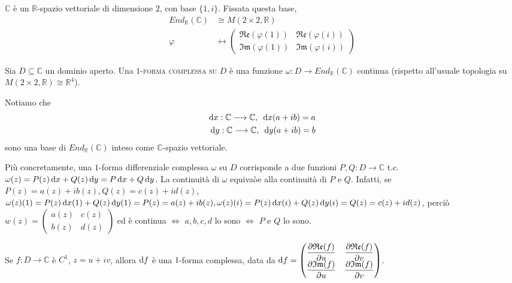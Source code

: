 $\mathbb{C}$ è un $\mathbb{R}$-spazio vettoriale di dimensione $2$, con base $\{1, i\}$. Fissata questa base,
\begin{align*}
  End_{\mathbb{R}}(\mathbb{C}) &\cong M(2 \times 2, \mathbb{R})\\
  \varphi &\longleftrightarrow \begin{pmatrix}
    \mathfrak{Re}(\varphi(1)) & \mathfrak{Re}(\varphi(i))\\
    \mathfrak{Im}(\varphi(1)) & \mathfrak{Im}(\varphi(i))
\end{pmatrix}
\end{align*}

\begin{defn}
  Sia $D \subseteq \mathbb{C}$ un dominio aperto. Una \textsc{$1$-forma complessa su $D$} è una funzione $\omega:D \longrightarrow End_{\mathbb{R}}(\mathbb{C})$ continua (rispetto all'usuale topologia su $M(2 \times 2, \mathbb{R}) \cong \mathbb{R}^4$).
\end{defn}

Notiamo che
\begin{align*}
  \mathop{}\!\mathrm{d} x: \mathbb{C} \longrightarrow \mathbb{C}, \,\,\, \mathop{}\!\mathrm{d} x(a+ib)=a\\
  \mathop{}\!\mathrm{d} y: \mathbb{C} \longrightarrow \mathbb{C}, \,\,\, \mathop{}\!\mathrm{d} y(a+ib)=b
\end{align*}
sono una base di $End_{\mathbb{R}}(\mathbb{C})$ inteso come $\mathbb{C}$-spazio vettoriale.

Più concretamente, una $1$-forma differenziale complessa $\omega$ su $D$ corrisponde a due funzioni $P, Q:D \longrightarrow \mathbb{C}$ t.c. $\omega(z)=P(z)\mathop{}\!\mathrm{d} x+Q(z)\mathop{}\!\mathrm{d} y=P\mathop{}\!\mathrm{d} x+Q\mathop{}\!\mathrm{d} y$. La continuità di $\omega$ equivaòe alla continuità di $P$ e $Q$. Infatti, se $P(z)=a(z)+ib(z), Q(z)=c(z)+id(z)$, $\omega(z)(1)=P(z)\mathop{}\!\mathrm{d} x(1)+Q(z)\mathop{}\!\mathrm{d} y(1)=P(z)=a(z)+ib(z), \omega(z)(i)=P(z)\mathop{}\!\mathrm{d} x(i)+Q(z)\mathop{}\!\mathrm{d} y(i)=Q(z)=c(z)+id(z)$, perciò $w(z)=\begin{pmatrix}
  a(z) & c(z)\\
  b(z) & d(z)
\end{pmatrix}$ ed è continua $\iff$ $a, b, c, d$ lo sono $\iff$ $P$ e $Q$ lo sono.

\begin{ex}
  Se $f:D \longrightarrow \mathbb{C}$ è $C^1$, $z=u+iv$, allora $\mathop{}\!\mathrm{d} f$ è una $1$-forma complessa, data da $\mathop{}\!\mathrm{d} f=\begin{pmatrix}
    \dfrac{\partial\mathfrak{Re}(f)}{\partial u} & \dfrac{\partial\mathfrak{Re}(f)}{\partial v}\\
    \dfrac{\partial\mathfrak{Im}(f)}{\partial u} & \dfrac{\partial\mathfrak{Im}(f)}{\partial v}
\end{pmatrix}$.
\end{ex}

